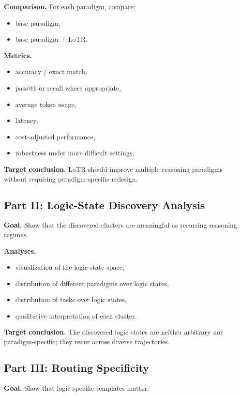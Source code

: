 \documentclass[11pt]{article}
\begin{document}
\textbf{Comparison.}
For each paradigm, compare:
\begin{itemize}[leftmargin=1.5em]
    \item base paradigm,
    \item base paradigm + LoTR.
\end{itemize}

\textbf{Metrics.}
\begin{itemize}[leftmargin=1.5em]
    \item accuracy / exact match,
    \item pass@1 or recall where appropriate,
    \item average token usage,
    \item latency,
    \item cost-adjusted performance,
    \item robustness under more difficult settings.
\end{itemize}

\textbf{Target conclusion.}
LoTR should improve multiple reasoning paradigms without requiring paradigm-specific redesign.

\subsection{Part II: Logic-State Discovery Analysis}

\textbf{Goal.} Show that the discovered clusters are meaningful as recurring reasoning regimes.

\textbf{Analyses.}
\begin{itemize}[leftmargin=1.5em]
    \item visualization of the logic-state space,
    \item distribution of different paradigms over logic states,
    \item distribution of tasks over logic states,
    \item qualitative interpretation of each cluster.
\end{itemize}

\textbf{Target conclusion.}
The discovered logic states are neither arbitrary nor paradigm-specific; they recur across diverse trajectories.

\subsection{Part III: Routing Specificity}

\textbf{Goal.} Show that logic-specific templates matter.
\end{document}
